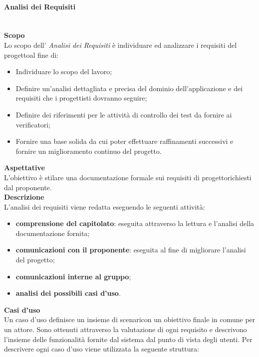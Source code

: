 \paragraph{Analisi dei Requisiti}\mbox{}\\ [1mm]
\textbf{Scopo}\\ 
Lo scopo dell' \textit{Analisi dei Requisiti} è individuare ed analizzare i requisiti del progetto\glosp al fine di:
\begin{itemize}
	\item Individuare lo scopo del lavoro;
	\item Definire un'analisi dettagliata e precisa del dominio dell'applicazione e dei requisiti che i progettisti dovranno seguire;
	\item Definire dei riferimenti per le attività di controllo dei test da fornire ai verificatori;
	\item Fornire una base solida da cui poter effettuare raffinamenti successivi e fornire un miglioramento continuo del progetto\glo.
\end{itemize}
\textbf{Aspettative}\\
L'obiettivo è stilare una documentazione formale sui requisiti di progetto\glosp richiesti dal proponente. \\
\textbf{Descrizione}\\
L'analisi dei requisiti viene redatta eseguendo le seguenti attività:
\begin{itemize}
	\item \textbf{comprensione del capitolato}\glo: eseguita attraverso la lettura e l'analisi della documentazione fornita;
	\item \textbf{comunicazioni con il proponente}: eseguita al fine di migliorare l'analisi del progetto;
	\item \textbf{comunicazioni interne al gruppo};
	\item \textbf{analisi dei possibili casi d'uso\glo}.
\end{itemize}
\textbf{Casi d'uso\glo}\\
Un caso d'uso definisce un insieme di scenari\glosp con un obiettivo finale in comune per un attore. Sono ottenuti attraverso la valutazione di ogni requisito e descrivono l'insieme delle funzionalità fornite dal sistema dal punto di vista degli utenti.
Per descrivere ogni caso d'uso viene utilizzata la seguente struttura:
